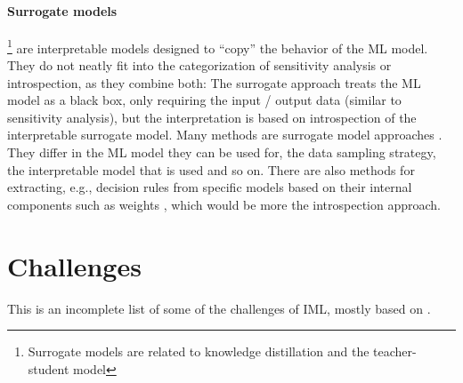 \documentclass[runningheads]{llncs}
\begin{document}
\paragraph{Surrogate models}\footnote{Surrogate models are related to knowledge distillation and the teacher-student model} are interpretable models designed to \enquote{copy} the behavior of the ML model.
They do not neatly fit into the categorization of sensitivity analysis or introspection, as they combine both:
The surrogate approach treats the ML model as a black box, only requiring the input / output data  (similar to sensitivity analysis), but the interpretation is based on introspection of the interpretable surrogate model.
Many methods are surrogate model approaches \cite{puri2017magix,molnar2019,ming2018rulematrix,ribeiro2016should,frosst2017distilling,bastani2017interpreting}.
They differ in the ML model they can be used for, the data sampling strategy, the interpretable model that is used and so on.
There are also methods for extracting, e.g., decision rules from specific models based on their internal components such as weights \cite{andrews1995survey,augasta2012rule}, which would be more the introspection approach.


\section*{Challenges}

This is an incomplete list of some of the challenges of IML, mostly based on \cite{molnar2020pitfalls}.
\end{document}
